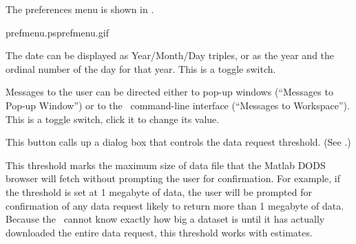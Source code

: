 
The preferences menu is shown in .

%
{prefmenu.ps}{prefmenu.gif}{}

\begin{description}


The date can be displayed as Year/Month/Day triples, or as the
year and the ordinal number of the day for that year. This is a
toggle switch.


Messages to the user can be directed either to pop-up windows
(``Messages to Pop-up Window'') or to the \matlab\ command-line
interface (``Messages to Workspace'').  This is a toggle switch, click
it to change its value.


\label{gui,ref,threshold-desc}
This button calls up a dialog box that controls the data request
threshold. (See .)

This threshold marks the maximum size of data file that the Matlab
DODS browser will fetch without prompting the user for confirmation.
For example, if the threshold is set at 1 megabyte of data, the user
will be prompted for confirmation of any data request likely to return
more than 1 megabyte of data. Because the \GUI\ cannot know exactly
how big a dataset is until it has actually downloaded the entire data
request, this threshold works with estimates.




\end{description}
